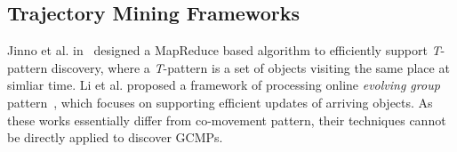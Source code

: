  
\subsection{Trajectory Mining Frameworks}
Jinno et al. in~\cite{jinno2012paralleltpattern} designed a MapReduce based algorithm to efficiently support \emph{T}-pattern discovery, where a \emph{T}-pattern is a set of objects visiting the same place at simliar time. Li et al. proposed a framework of processing online \emph{evolving group} pattern~\cite{li2013onlinegroup}, which focuses on supporting efficient updates of arriving objects. 
As these works essentially differ from co-movement pattern, their techniques cannot be directly applied to discover GCMPs.



